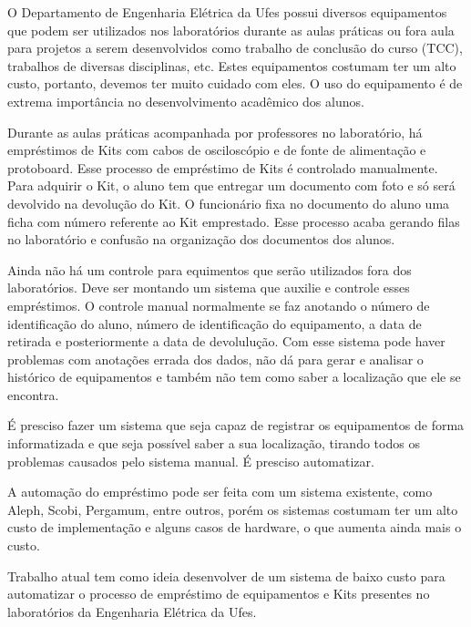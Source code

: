 \vspace{-42pt}

O Departamento de Engenharia Elétrica da Ufes possui diversos equipamentos que podem ser utilizados nos laboratórios durante as aulas práticas ou fora aula  para projetos a serem desenvolvidos como trabalho de conclusão do curso (TCC), trabalhos de diversas disciplinas, etc. Estes equipamentos costumam ter um alto custo, portanto, devemos ter muito cuidado com eles. O uso do equipamento é de extrema importância no desenvolvimento acadêmico dos alunos.
	

Durante as aulas práticas acompanhada por professores no laboratório, há empréstimos de Kits com cabos de osciloscópio e de fonte de alimentação e protoboard. Esse processo de empréstimo de Kits é controlado manualmente. Para adquirir o Kit, o aluno tem que entregar um documento com foto e só será devolvido na devolução do Kit. O funcionário fixa no documento do aluno uma ficha com número referente ao Kit emprestado. Esse processo acaba gerando filas no laboratório e confusão na organização dos documentos dos alunos. 

Ainda não há um controle para equimentos que serão utilizados fora dos laboratórios. Deve ser montando um sistema que auxilie e controle esses empréstimos.  O controle manual normalmente se faz anotando o número de identificação do aluno, número de identificação do equipamento, a data de retirada e posteriormente a data de devolulução. Com esse sistema pode haver problemas com anotações errada dos dados, não dá para gerar e analisar o histórico de equipamentos e também não tem como saber a localização que ele se encontra. 

É presciso fazer um sistema que seja capaz de registrar os equipamentos de forma informatizada e que seja possível saber a sua localização, tirando todos os problemas causados pelo sistema manual. É presciso automatizar.

A automação do empréstimo pode ser feita com um sistema existente, como Aleph, Scobi, Pergamum, entre outros, porém os sistemas costumam ter um alto custo de implementação e alguns casos de hardware, o que aumenta ainda mais o custo.

Trabalho atual tem como ideia  desenvolver de um sistema de baixo custo para automatizar o processo de empréstimo de equipamentos e  Kits presentes no laboratórios da Engenharia Elétrica da Ufes.